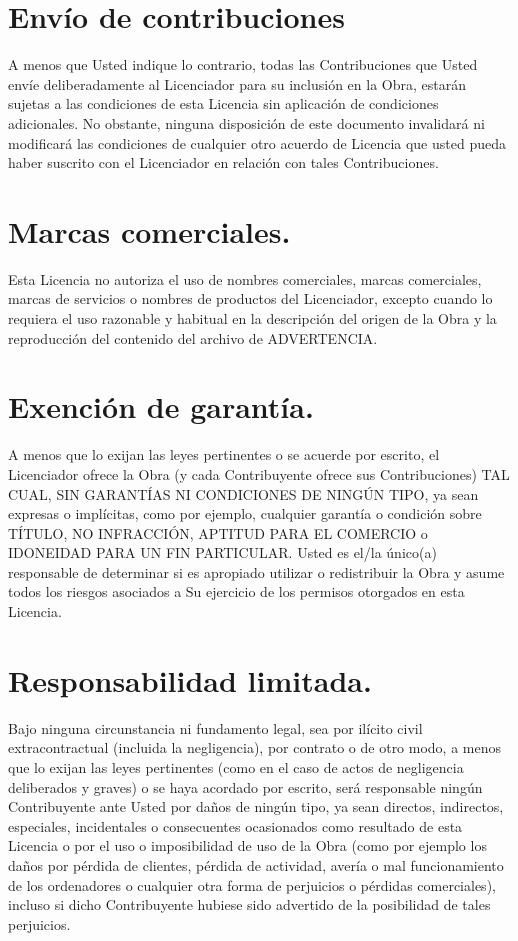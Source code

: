 \section{Envío de contribuciones}A menos que Usted indique lo contrario, todas las Contribuciones que Usted envíe deliberadamente al Licenciador para su inclusión en la Obra, estarán sujetas a las condiciones de esta Licencia sin aplicación de condiciones adicionales. No obstante, ninguna disposición de este documento invalidará ni modificará las condiciones de cualquier otro acuerdo de Licencia que usted pueda haber suscrito con el Licenciador en relación con tales Contribuciones.
\section{Marcas comerciales.}Esta Licencia no autoriza el uso de nombres comerciales, marcas comerciales, marcas de servicios o nombres de productos del Licenciador, excepto cuando lo requiera el uso razonable y habitual en la descripción del origen de la Obra y la reproducción del contenido del archivo de ADVERTENCIA.
\section{Exención de garantía.}A menos que lo exijan las leyes pertinentes o se acuerde por escrito, el Licenciador ofrece la Obra (y cada Contribuyente ofrece sus Contribuciones) TAL CUAL, SIN GARANTÍAS NI CONDICIONES DE NINGÚN TIPO, ya sean expresas o implícitas, como por ejemplo, cualquier garantía o condición sobre TÍTULO, NO INFRACCIÓN, APTITUD PARA EL COMERCIO o IDONEIDAD PARA UN FIN PARTICULAR. Usted es el/la único(a) responsable de determinar si es apropiado utilizar o redistribuir la Obra y asume todos los riesgos asociados a Su ejercicio de los permisos otorgados en esta Licencia.
\section{Responsabilidad limitada.}Bajo ninguna circunstancia ni fundamento legal, sea por ilícito civil extracontractual (incluida la negligencia), por contrato o de otro modo, a menos que lo exijan las leyes pertinentes (como en el caso de actos de negligencia deliberados y graves) o se haya acordado por escrito, será responsable ningún Contribuyente ante Usted por daños de ningún tipo, ya sean directos, indirectos, especiales, incidentales o consecuentes ocasionados como resultado de esta Licencia o por el uso o imposibilidad de uso de la Obra (como por ejemplo los daños por pérdida de clientes, pérdida de actividad, avería o mal funcionamiento de los ordenadores o cualquier otra forma de perjuicios o pérdidas comerciales), incluso si dicho Contribuyente hubiese sido advertido de la posibilidad de tales perjuicios.
\newpage
